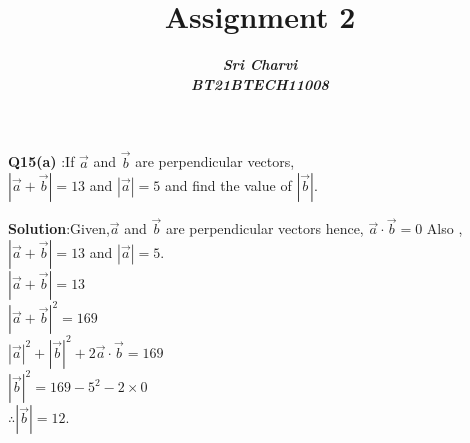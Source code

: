 \documentclass[journal,12pt,twocolumn]{IEEEtran}
\title{ Assignment 2}
\author{\textbf{\textit{Sri Charvi}}\\
\textbf{\textit{BT21BTECH11008}}}
\begin{document}
\maketitle
\textbf{Q15(a) }:If $\vec{a}$ and $\vec{b}$ are perpendicular vectors,\\
$| \vec{a}+\vec{b}| = 13$ and $| \vec{a}| = 5$ and find the value of 
$|\vec{b}|$.

\medskip
\textbf{Solution}:Given,$\vec{a}$ and $\vec{b}$ are perpendicular vectors hence, $\vec{a}\cdot\vec{b} = 0$
Also ,$|\vec{a}+\vec{b}| = 13$ and $|\vec{a}|= 5.$\\


$|\vec{a}+\vec{b}| = 13$\\
$|\vec{a}+\vec{b}|^2 = 169$\\
$|\vec{a}|^2 + |\vec{b}|^2 + 2\vec{a}\cdot\vec{b} = 169$\\
$|\vec{b}|^2 = 169-5^2-2\times0$\\
$\therefore |\vec{b}|=12.$


  
 
 
 
 
\end{document}
